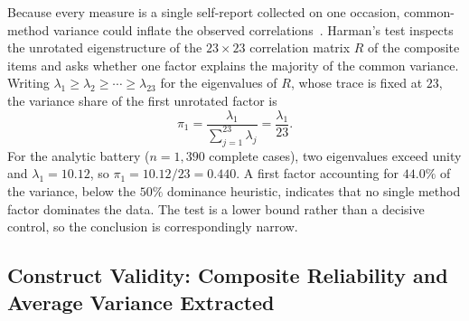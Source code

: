 Because every measure is a single self-report collected on one occasion, common-method variance could inflate the observed correlations~\parencite{Podsakoff_2003}. Harman's test inspects the unrotated eigenstructure of the $23\times23$ correlation matrix $R$ of the composite items and asks whether one factor explains the majority of the common variance. Writing $\lambda_1\ge\lambda_2\ge\cdots\ge\lambda_{23}$ for the eigenvalues of $R$, whose trace is fixed at $23$, the variance share of the first unrotated factor is
\begin{equation}
  \pi_1 = \frac{\lambda_1}{\sum_{j=1}^{23}\lambda_j} = \frac{\lambda_1}{23}.
\end{equation}
For the analytic battery ($n=1{,}390$ complete cases), two eigenvalues exceed unity and $\lambda_1=10.12$, so $\pi_1 = 10.12/23 = 0.440$. A first factor accounting for $44.0\%$ of the variance, below the $50\%$ dominance heuristic, indicates that no single method factor dominates the data. The test is a lower bound rather than a decisive control, so the conclusion is correspondingly narrow.

\subsection{Construct Validity: Composite Reliability and Average Variance Extracted}

